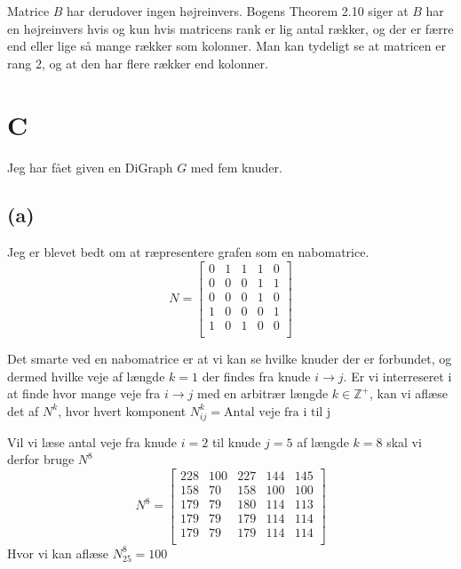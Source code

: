 \documentclass[a4paper,fleqn]{article}
\begin{document}
	Matrice $B$ har derudover ingen højreinvers. Bogens Theorem 2.10 siger at $B$ har en
	højreinvers hvis
	og kun hvis matricens rank er lig antal rækker, og der er færre end eller lige så mange 
	rækker som kolonner. Man kan tydeligt se at matricen er rang 2, og at den har flere rækker
	end kolonner.\\

	\section{C}
	Jeg har fået given en DiGraph $G$ med fem knuder. 

	\subsection{(a)}
	Jeg er blevet bedt om at ræpresentere grafen som en nabomatrice.\\
	\begin{equation}
		N = \begin{bmatrix}
			0 & 1 & 1 & 1 & 0\\
			0 & 0 & 0 & 1 & 1\\
			0 & 0 & 0 & 1 & 0\\
			1 & 0 & 0 & 0 & 1\\
			1 & 0 & 1 & 0 & 0\\
		\end{bmatrix}
	\end{equation}

	Det smarte ved en nabomatrice er at vi kan se hvilke knuder der er forbundet, og dermed
	hvilke veje af længde $k = 1$ der findes fra knude $i \rightarrow j$. Er vi interreseret i
	at finde hvor mange veje fra $i \rightarrow j$ med en arbitrær længde $k \in \mathbb{Z}^+$,
	kan vi aflæse det af $N^k$, hvor hvert komponent $N^k_{ij} = \text{Antal veje fra i til j}$
	
	Vil vi læse antal veje fra knude $i = 2$ til knude $j = 5$ af længde $k = 8$ skal vi derfor
	bruge $N^8$
	\[
	N^8 = \begin{bmatrix}
		228&100&227&144&145\\
		158&70&158&100&100\\
		179&79&180&114&113\\
		179&79&179&114&114\\
		179&79&179&114&114\\
	\end{bmatrix}\]
	Hvor vi kan aflæse $N^8_{25} = 100$
\end{document}
